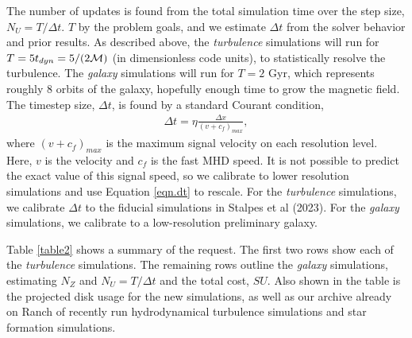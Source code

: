 The number of updates is found from the total simulation time over the step
size, $N_U=T/\Delta t$. $T$ by the
problem goals, and we estimate $\Delta t$ from the solver behavior and prior
results.
As described above, the \emph{turbulence} simulations will run for
 $T=5 t_{dyn} = 5/(2\mathcal{M})$ (in dimensionless code units), to statistically
resolve the turbulence. The \emph{galaxy} simulations will run for $T=2$ Gyr,
which represents roughly 8 orbits of the galaxy, hopefully enough time to grow
the magnetic field.  The timestep size, $\Delta t$,
is found by a standard Courant condition,
\begin{align}
	\Delta t = \eta \frac{\Delta x}{(v+c_f)_{max}} \label{eqn.dt},
\end{align}
where $(v+c_f)_{max}$ is the maximum signal velocity on each resolution level.  Here, $v$ is the velocity
and $c_f$ is the fast MHD speed.  It is not possible to predict the exact value
of this signal speed, so we calibrate to lower resolution simulations and use
Equation \ref{eqn.dt} to rescale.  For the \emph{turbulence} simulations, we
calibrate $\Delta t$ to the fiducial simulations in Stalpes et al (2023).  For
the \emph{galaxy} simulations, we calibrate to a low-resolution preliminary
galaxy.

Table \ref{table2} shows a summary of the request.  The first two rows show each
of  the \emph{turbulence} simulations.  The remaining rows outline the
\emph{galaxy} simulations, estimating $N_Z$ and $N_U=T/\Delta t$ and the total
cost, $SU$.  Also shown in the table is the projected disk usage for the new
simulations, as well as our archive already on Ranch of recently run
hydrodynamical turbulence simulations and star formation simulations.
